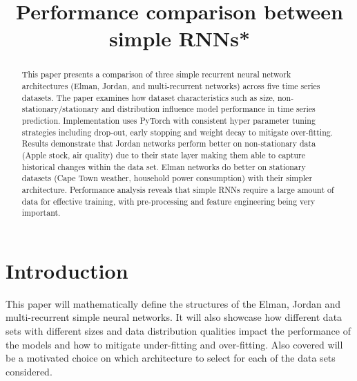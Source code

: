 \documentclass[conference]{IEEEtran}
\begin{document}
\title{Performance comparison between simple RNNs*\\
{\footnotesize}
}

\author{

}

\maketitle

\begin{abstract}
This paper presents a comparison of three simple recurrent neural network architectures (Elman, Jordan, and multi-recurrent networks) across five time series datasets. The paper examines how dataset characteristics such as size, non-stationary/stationary and distribution influence model performance in time series prediction. Implementation uses PyTorch with consistent hyper parameter tuning strategies including drop-out, early stopping and weight decay to mitigate over-fitting. Results demonstrate that Jordan networks perform better on non-stationary data (Apple stock, air quality) due to their state layer making them able to capture historical changes within the data set. Elman networks do better on stationary datasets (Cape Town weather, household power consumption) with their simpler architecture. Performance analysis reveals that simple RNNs require a large amount of data for effective training, with pre-processing and feature engineering being very important.
\end{abstract}



\section{Introduction}


This paper will mathematically define the structures of the Elman, Jordan and multi-recurrent simple neural networks. It will also showcase how different data sets with different sizes and data distribution qualities impact the performance of the models and how to mitigate under-fitting and over-fitting. Also covered will be a motivated choice on which architecture to select for each of the data sets considered.
\end{document}
